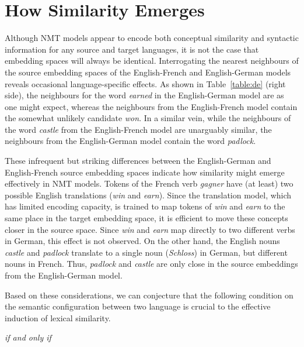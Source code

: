\section{How Similarity Emerges}
\label{section:exp}

Although NMT models appear to encode both conceptual similarity and syntactic information for any source and target languages, it is not the case that embedding spaces will always be identical. Interrogating the nearest neighbours of the source embedding spaces of the English-French and English-German models reveals occasional language-specific effects. As shown in Table~\ref{table:de} (right side), the neighbours for the word \emph{earned} in the English-German model are as one might expect, whereas the neighbours from the English-French model contain the somewhat unlikely candidate \emph{won}. In a similar vein, while the neighbours of the word \emph{castle} from the English-French model are unarguably similar, the neighbours from the English-German model contain the word \emph{padlock}.
 
These infrequent but striking differences between the English-German and English-French source embedding spaces indicate how similarity might emerge effectively in NMT models. Tokens of the French verb \emph{gagner} have (at least) two possible English translations (\emph{win} and \emph{earn}). Since the translation model, which has limited encoding capacity, is trained to map tokens of \emph{win} and \emph{earn} to the same place in the target embedding space, it is efficient to move these concepts closer in the source space. Since \emph{win} and \emph{earn} map directly to two different verbs in German, this effect is not observed. On the other hand, the English nouns \emph{castle} and \emph{padlock} translate to a single noun (\emph{Schloss}) in German, but different nouns in French. Thus, \emph{padlock} and \emph{castle} are only close in the source embeddings from the English-German model. 

Based on these considerations, we can conjecture that the following condition on the semantic configuration between two language is crucial to the effective induction of lexical similarity. 


{\centering \emph{if and only if} \\}

